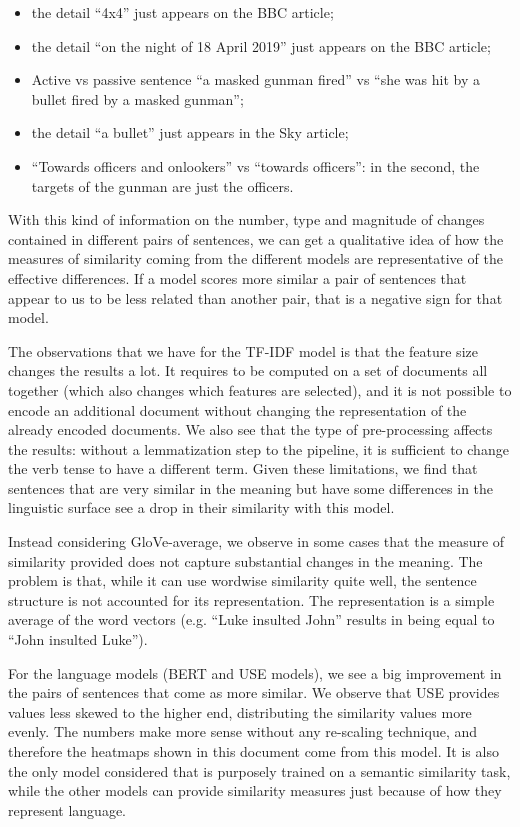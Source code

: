 \begin{itemize}
    \item the detail ``4x4'' just appears on the BBC article;
    \item the detail ``on the night of 18 April 2019'' just appears on the BBC article;
    \item Active vs passive sentence ``a masked gunman fired'' vs ``she was hit by a bullet fired by a masked gunman'';
    \item the detail ``a bullet'' just appears in the Sky article;
    \item ``Towards officers and onlookers'' vs ``towards officers'': in the second, the targets of the gunman are just the officers.
\end{itemize}

With this kind of information on the number, type and magnitude of changes contained in different pairs of sentences, we can get a qualitative idea of how the measures of similarity coming from the different models are representative of the effective differences. If a model scores more similar a pair of sentences that appear to us to be less related than another pair, that is a negative sign for that model. 


The observations that we have for the TF-IDF model is that the feature size changes the results a lot.
It requires to be computed on a set of documents all together (which also changes which features are selected), and it is not possible to encode an additional document without changing the representation of the already encoded documents.
We also see that the type of pre-processing affects the results: without a lemmatization step to the pipeline, it is sufficient to change the verb tense to have a different term.
Given these limitations, we find that sentences that are very similar in the meaning but have some differences in the linguistic surface see a drop in their similarity with this model.

Instead considering GloVe-average, we observe in some cases that the measure of similarity provided does not capture substantial changes in the meaning. The problem is that, while it can use wordwise similarity quite well, the sentence structure is not accounted for its representation. The representation is a simple average of the word vectors (e.g. ``Luke insulted John'' results in being equal to ``John insulted Luke'').

For the language models (BERT and USE models), we see a big improvement in the pairs of sentences that come as more similar.
We observe that USE provides values less skewed to the higher end, distributing the similarity values more evenly. The numbers make more sense without any re-scaling technique, and therefore the heatmaps shown in this document come from this model.
It is also the only model considered that is purposely trained on a semantic similarity task, while the other models can provide similarity measures just because of how they represent language.


